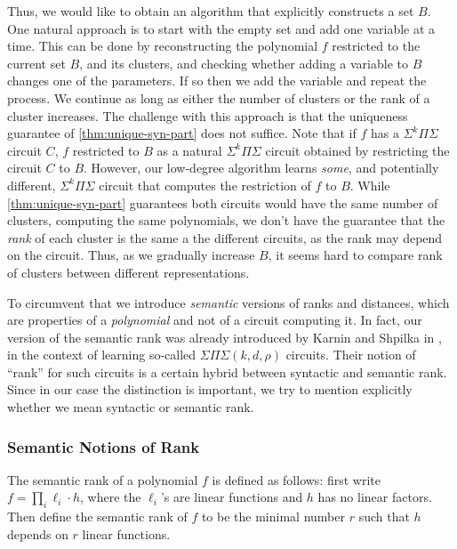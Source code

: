 \documentclass[12pt]{article}
\newcommand{\SumProdSum}{\Sigma \Pi \Sigma}
\newcommand{\Sps}[1]{\Sigma^{#1} \Pi\Sigma}
\begin{document}
	Thus, we would like to obtain an algorithm that explicitly constructs a set $B$. One natural approach is to start with the empty set and add one variable at a time. This can be done by reconstructing the polynomial $f$ restricted to the current set $B$, and its clusters, and checking whether adding a variable to $B$ changes one of the parameters. If so then we add the variable and repeat the process. We continue as long as either the number of clusters or the rank of a cluster increases. The challenge with this approach is that the uniqueness guarantee of \autoref{thm:unique-syn-part} does not suffice. Note that if $f$ has a $\Sps{k}$ circuit $C$, $f$ restricted to $B$ as a natural $\Sps{k}$ circuit obtained by restricting the circuit $C$ to $B$. However, our low-degree algorithm learns \emph{some}, and potentially different, $\Sps{k}$ circuit that computes the restriction of $f$ to $B$. While \autoref{thm:unique-syn-part} guarantees both circuits would have the same number of clusters, computing the same polynomials, we don't have the guarantee that the \emph{rank} of each cluster is  the same a the different circuits, as the rank may depend on the circuit. Thus, as we gradually increase $B$, it seems hard to compare rank of clusters between different representations.
	
	To circumvent that we introduce \emph{semantic} versions of ranks and distances, which are properties of a \emph{polynomial} and not of a circuit computing it. In fact, our version of the semantic rank was already introduced by Karnin and Shpilka in \cite{KarninShpilka08, KarninShpilka09}, in the context of learning so-called $\SumProdSum(k,d,\rho)$ circuits. Their notion of ``rank'' for such circuits is a certain hybrid between syntactic and semantic rank. Since in our case the distinction is important, we try to mention explicitly whether we mean syntactic or semantic rank.
	
	\subsubsection{Semantic Notions of Rank}
	\label{sec:intro-semantic}
	
	The semantic rank of a polynomial $f$ is defined as follows: first write $f = \prod_i \ell_i \cdot h$, where the $\ell_i$'s are linear functions and $h$ has no linear factors. Then define the semantic rank of $f$ to be the minimal number $r$ such that $h$ depends on $r$ linear functions.
	
\end{document}

